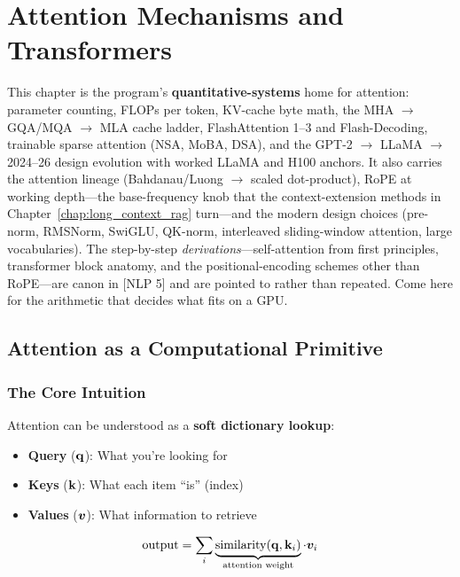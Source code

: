 \chapter{Attention Mechanisms and Transformers}
\label{chap:attention_transformers}

\begin{tldr}
This chapter is the program's \textbf{quantitative-systems} home for attention: parameter counting, FLOPs per token, KV-cache byte math, the MHA $\to$ GQA/MQA $\to$ MLA cache ladder, FlashAttention 1--3 and Flash-Decoding, trainable sparse attention (NSA, MoBA, DSA), and the GPT-2 $\to$ LLaMA $\to$ 2024--26 design evolution with worked LLaMA and H100 anchors. It also carries the attention lineage (Bahdanau/Luong $\to$ scaled dot-product), RoPE at working depth---the base-frequency knob that the context-extension methods in Chapter~\ref{chap:long_context_rag} turn---and the modern design choices (pre-norm, RMSNorm, SwiGLU, QK-norm, interleaved sliding-window attention, large vocabularies). The step-by-step \textit{derivations}---self-attention from first principles, transformer block anatomy, and the positional-encoding schemes other than RoPE---are canon in [NLP 5] and are pointed to rather than repeated. Come here for the arithmetic that decides what fits on a GPU.
\end{tldr}

\section{Attention as a Computational Primitive}
\label{sec:attention_primitive}

\subsection{The Core Intuition}

Attention can be understood as a \textbf{soft dictionary lookup}:

\begin{itemize}
    \item \textbf{Query} ($\mathbf{q}$): What you're looking for
    \item \textbf{Keys} ($\mathbf{k}$): What each item ``is'' (index)
    \item \textbf{Values} ($\bm{v}$): What information to retrieve
\end{itemize}

\begin{equation}
\text{output} = \sum_i \underbrace{\text{similarity}(\mathbf{q}, \mathbf{k}_i)}_{\text{attention weight}} \cdot \bm{v}_i
\end{equation}

